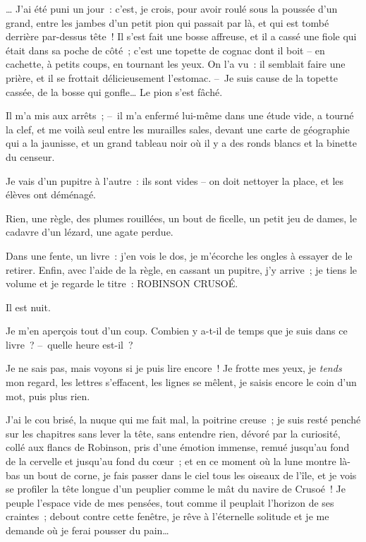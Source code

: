 \documentclass[french,twoside]{book} %
\begin{document}
\noindent … J’ai été puni un jour : c’est, je crois, pour avoir roulé sous la poussée d’un grand, entre les jambes d’un petit pion qui passait par là, et qui est tombé derrière par-dessus tête ! Il s’est fait une bosse affreuse, et il a cassé une fiole qui était dans sa poche de côté ; c’est une topette de cognac dont il boit – en cachette, à petits coups, en tournant les yeux. On l’a vu : il semblait faire une prière, et il se frottait délicieusement l’estomac. – Je suis cause de la topette cassée, de la bosse qui gonfle… Le pion s’est fâché.\par
Il m’a mis aux arrêts ; – il m’a enfermé lui-même dans une étude vide, a tourné la clef, et me voilà seul entre les murailles sales, devant une carte de géographie qui a la jaunisse, et un grand tableau noir où il y a des ronds blancs et la binette du censeur.\par
Je vais d’un pupitre à l’autre : ils sont vides – on doit nettoyer la place, et les élèves ont déménagé.\par
Rien, une règle, des plumes rouillées, un bout de ficelle, un petit jeu de dames, le cadavre d’un lézard, une agate perdue.\par
Dans une fente, un livre : j’en vois le dos, je m’écorche les ongles à essayer de le retirer. Enfin, avec l’aide de la règle, en cassant un pupitre, j’y arrive ; je tiens le volume et je regarde le titre : ROBINSON CRUSOÉ.\par
\bigbreak
\noindent Il est nuit.\par
Je m’en aperçois tout d’un coup. Combien y a-t-il de temps que je suis dans ce livre ? – quelle heure est-il ?\par
Je ne sais pas, mais voyons si je puis lire encore ! Je frotte mes yeux, je \emph{tends} mon regard, les lettres s’effacent, les lignes se mêlent, je saisis encore le coin d’un mot, puis plus rien.\par
J’ai le cou brisé, la nuque qui me fait mal, la poitrine creuse ; je suis resté penché sur les chapitres sans lever la tête, sans entendre rien, dévoré par la curiosité, collé aux flancs de Robinson, pris d’une émotion immense, remué jusqu’au fond de la cervelle et jusqu’au fond du cœur ; et en ce moment où la lune montre là-bas un bout de corne, je fais passer dans le ciel tous les oiseaux de l’île, et je vois se profiler la tête longue d’un peuplier comme le mât du navire de Crusoé ! Je peuple l’espace vide de mes pensées, tout comme il peuplait l’horizon de ses craintes ; debout contre cette fenêtre, je rêve à l’éternelle solitude et je me demande où je ferai pousser du pain…\par
\end{document}
